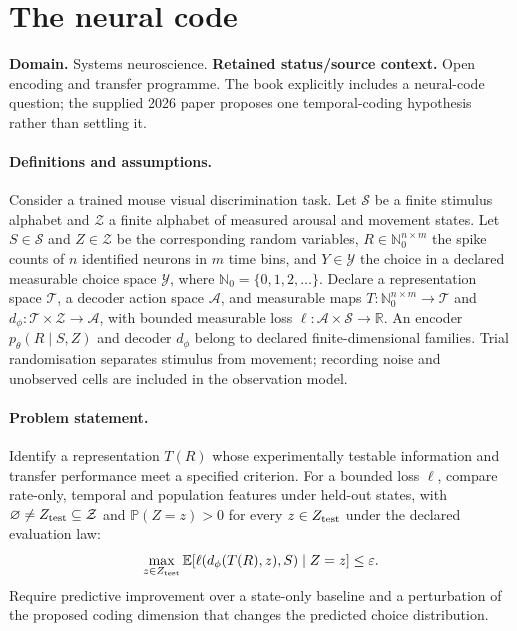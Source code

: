 \documentclass[11pt]{article}
\begin{document}
\section*{The neural code}
\label{prob:101}
\label{rank:75}
\par\smallskip

\noindent\textbf{Domain.} Systems neuroscience. \quad \textbf{Retained status/source context.} Open encoding and transfer programme. The book explicitly includes a neural-code question; the supplied 2026 paper proposes one temporal-coding hypothesis rather than settling it.
\paragraph{Definitions and assumptions.} Consider a trained mouse visual discrimination task. Let $\mathcal S$ be a finite stimulus alphabet and $\mathcal Z$ a finite alphabet of measured arousal and movement states. Let $S\in\mathcal S$ and $Z\in\mathcal Z$ be the corresponding random variables, $R\in\mathbb{N}_0^{n\times m}$ the spike counts of $n$ identified neurons in $m$ time bins, and $Y\in\mathcal Y$ the choice in a declared measurable choice space $\mathcal Y$, where $\mathbb N_0=\{0,1,2,\ldots\}$. Declare a representation space $\mathcal T$, a decoder action space $\mathcal A$, and measurable maps $T:\mathbb N_0^{n\times m}\to\mathcal T$ and $d_\phi:\mathcal T\times\mathcal Z\to\mathcal A$, with bounded measurable loss $\ell:\mathcal A\times\mathcal S\to\mathbb R$. An encoder $p_\theta(R\mid S,Z)$ and decoder $d_\phi$ belong to declared finite-dimensional families. Trial randomisation separates stimulus from movement; recording noise and unobserved cells are included in the observation model.
\paragraph{Problem statement.} Identify a representation $T(R)$ whose experimentally testable information and transfer performance meet a specified criterion. For a bounded loss $\ell$, compare rate-only, temporal and population features under held-out states, with $\varnothing\ne Z_{\rm test}\subseteq\mathcal Z$ and $\mathbb P(Z=z)>0$ for every $z\in Z_{\rm test}$ under the declared evaluation law:
\[
\max_{z\in Z_{\rm test}}\mathbb{E}[\ell(d_\phi(T(R),z),S)\mid Z=z]\leq\varepsilon.
\]
Require predictive improvement over a state-only baseline and a perturbation of the proposed coding dimension that changes the predicted choice distribution.
\end{document}
